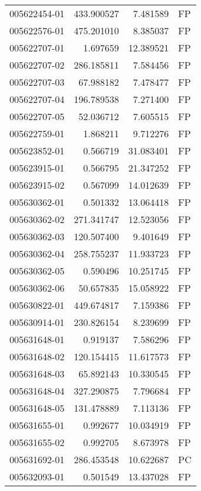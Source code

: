 \begin{tabular}{lrrl}
005622454-01 &  433.900527 &       7.481589 &   FP \\
005622576-01 &  475.201010 &       8.385037 &   FP \\
005622707-01 &    1.697659 &      12.389521 &   FP \\
005622707-02 &  286.185811 &       7.584456 &   FP \\
005622707-03 &   67.988182 &       7.478477 &   FP \\
005622707-04 &  196.789538 &       7.271400 &   FP \\
005622707-05 &   52.036712 &       7.605515 &   FP \\
005622759-01 &    1.868211 &       9.712276 &   FP \\
005623852-01 &    0.566719 &      31.083401 &   FP \\
005623915-01 &    0.566795 &      21.347252 &   FP \\
005623915-02 &    0.567099 &      14.012639 &   FP \\
005630362-01 &    0.501332 &      13.064418 &   FP \\
005630362-02 &  271.341747 &      12.523056 &   FP \\
005630362-03 &  120.507400 &       9.401649 &   FP \\
005630362-04 &  258.755237 &      11.933723 &   FP \\
005630362-05 &    0.590496 &      10.251745 &   FP \\
005630362-06 &   50.657835 &      15.058922 &   FP \\
005630822-01 &  449.674817 &       7.159386 &   FP \\
005630914-01 &  230.826154 &       8.239699 &   FP \\
005631648-01 &    0.919137 &       7.586296 &   FP \\
005631648-02 &  120.154415 &      11.617573 &   FP \\
005631648-03 &   65.892143 &      10.330545 &   FP \\
005631648-04 &  327.290875 &       7.796684 &   FP \\
005631648-05 &  131.478889 &       7.113136 &   FP \\
005631655-01 &    0.992677 &      10.034919 &   FP \\
005631655-02 &    0.992705 &       8.673978 &   FP \\
005631692-01 &  286.453548 &      10.622687 &   PC \\
005632093-01 &    0.501549 &      13.437028 &   FP \\

\end{tabular}
